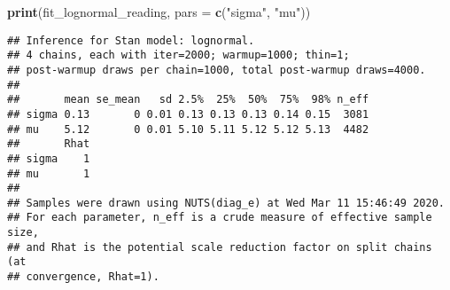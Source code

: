 \documentclass[12pt,ignorenonframetext,aspectratio=169]{beamer}
\newenvironment{Shaded}{\begin{snugshade}}{\end{snugshade}}
\newcommand{\DataTypeTok}[1]{\textcolor[rgb]{0.13,0.29,0.53}{#1}}
\newcommand{\KeywordTok}[1]{\textcolor[rgb]{0.13,0.29,0.53}{\textbf{#1}}}
\newcommand{\NormalTok}[1]{#1}
\newcommand{\OperatorTok}[1]{\textcolor[rgb]{0.81,0.36,0.00}{\textbf{#1}}}
\newcommand{\StringTok}[1]{\textcolor[rgb]{0.31,0.60,0.02}{#1}}
\begin{document}
\begin{frame}[fragile]

\scriptsize

\begin{Shaded}
\end{Shaded}

\normalsize

\end{frame}

\begin{frame}[fragile]

\scriptsize

\begin{Shaded}
\begin{Highlighting}[]
\KeywordTok{print}\NormalTok{(fit_lognormal_reading, }\DataTypeTok{pars =} \KeywordTok{c}\NormalTok{(}\StringTok{"sigma"}\NormalTok{, }\StringTok{"mu"}\NormalTok{))}
\end{Highlighting}
\end{Shaded}

\begin{verbatim}
## Inference for Stan model: lognormal.
## 4 chains, each with iter=2000; warmup=1000; thin=1; 
## post-warmup draws per chain=1000, total post-warmup draws=4000.
## 
##       mean se_mean   sd 2.5%  25%  50%  75%  98% n_eff
## sigma 0.13       0 0.01 0.13 0.13 0.13 0.14 0.15  3081
## mu    5.12       0 0.01 5.10 5.11 5.12 5.12 5.13  4482
##       Rhat
## sigma    1
## mu       1
## 
## Samples were drawn using NUTS(diag_e) at Wed Mar 11 15:46:49 2020.
## For each parameter, n_eff is a crude measure of effective sample size,
## and Rhat is the potential scale reduction factor on split chains (at 
## convergence, Rhat=1).
\end{verbatim}

\normalsize

\end{frame}
\end{document}
